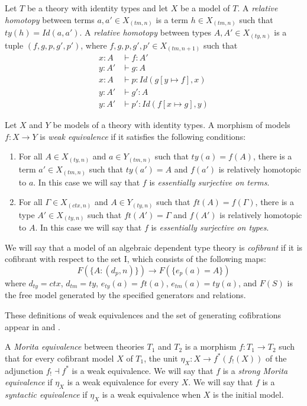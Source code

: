\documentclass[reqno]{amsart}
\theoremstyle{definition}
\theoremstyle{remark}
\newcommand{\I}{\mathrm{I}}
\numberwithin{figure}{section}
\begin{document}
Let $T$ be a theory with identity types and let $X$ be a model of $T$.
A \emph{relative homotopy} between terms $a,a' \in X_{(tm,n)}$ is a term $h \in X_{(tm,n)}$ such that $ty(h) = Id(a,a')$.
A \emph{relative homotopy} between types $A,A' \in X_{(ty,n)}$ is a tuple $(f,g,p,g',p')$, where $f,g,p,g',p' \in X_{(tm,n+1)}$ such that
\begin{align*}
x : A & \vdash f : A' \\
y : A' & \vdash g : A \\
x : A & \vdash p : Id(g[y \mapsto f], x) \\
y : A' & \vdash g' : A \\
y : A' & \vdash p' : Id(f[x \mapsto g], y)
\end{align*}

Let $X$ and $Y$ be models of a theory with identity types.
A morphism of models $f : X \to Y$ is \emph{weak equivalence} if it satisfies the following conditions:
\begin{enumerate}
\item For all $A \in X_{(ty,n)}$ and $a \in Y_{(tm,n)}$ such that $ty(a) = f(A)$,
there is a term $a' \in X_{(tm,n)}$ such that $ty(a') = A$ and $f(a')$ is relatively homotopic to $a$.
In this case we will say that $f$ is \emph{essentially surjective on terms}.
\item For all $\Gamma \in X_{(ctx,n)}$ and $A \in Y_{(ty,n)}$ such that $ft(A) = f(\Gamma)$,
there is a type $A' \in X_{(ty,n)}$ such that $ft(A') = \Gamma$ and $f(A')$ is relatively homotopic to $A$.
In this case we will say that $f$ is \emph{essentially surjective on types}.
\end{enumerate}

We will say that a model of an algebraic dependent type theory is \emph{cofibrant} if it is cofibrant with respect to the set $\I$, which consists of the following maps:
\[ F(\{ A : (d_p,n) \}) \to F(\{ e_p(a) = A \}) \]
where $d_{ty} = ctx$, $d_{tm} = ty$, $e_{ty}(a) = ft(a)$, $e_{tm}(a) = ty(a)$,
and $F(S)$ is the free model generated by the specified generators and relations.

These definitions of weak equivalences and the set of generating cofibrations appear in \cite{alg-models} and \cite{kap-lum-model}.

\begin{defn}
A \emph{Morita equivalence} between theories $T_1$ and $T_2$ is a morphism $f : T_1 \to T_2$ such that for every cofibrant model $X$ of $T_1$,
the unit $\eta_X : X \to f^*(f_!(X))$ of the adjunction $f_! \dashv f^*$ is a weak equivalence.
We will say that $f$ is a \emph{strong Morita equivalence} if $\eta_X$ is a weak equivalence for every $X$.
We will say that $f$ is a \emph{syntactic equivalence} if $\eta_X$ is a weak equivalence when $X$ is the initial model.
\end{defn}
\end{document}
